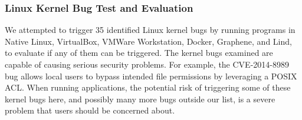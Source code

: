 \subsubsection{Linux Kernel Bug Test and Evaluation}
\label{Linux-Kernel-Bug-Test-and-Evaluation}

We attempted to trigger 35 identified Linux kernel bugs by running programs in
Native Linux, VirtualBox, VMWare Workstation, Docker, Graphene,
and Lind, to evaluate if any of them can be triggered.
The kernel bugs
examined are capable of causing serious security problems. For example,
the CVE-2014-8989 bug allows local users to bypass intended file
permissions by leveraging a POSIX ACL.
When running applications, the potential risk of triggering some of these
kernel bugs here,
and possibly many more bugs outside our list, is a severe problem that
users should be concerned about.

